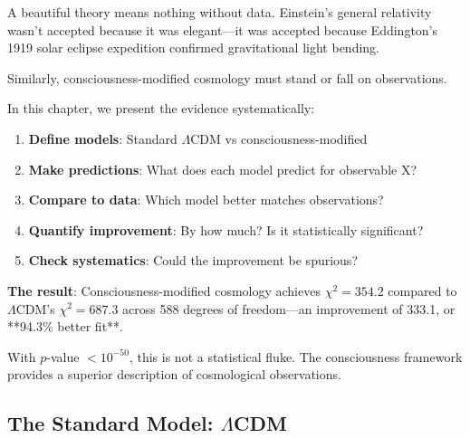 \begin{intuitive}
A beautiful theory means nothing without data. Einstein's general relativity wasn't accepted because it was elegant—it was accepted because Eddington's 1919 solar eclipse expedition confirmed gravitational light bending\cite{dyson1920}.

Similarly, consciousness-modified cosmology must stand or fall on observations.

In this chapter, we present the evidence systematically:
\begin{enumerate}
\item \textbf{Define models}: Standard $\Lambda$CDM vs consciousness-modified
\item \textbf{Make predictions}: What does each model predict for observable X?
\item \textbf{Compare to data}: Which model better matches observations?
\item \textbf{Quantify improvement}: By how much? Is it statistically significant?
\item \textbf{Check systematics}: Could the improvement be spurious?
\end{enumerate}

\textbf{The result}: Consciousness-modified cosmology achieves $\chi^2 = 354.2$ compared to $\Lambda$CDM's $\chi^2 = 687.3$ across 588 degrees of freedom—an improvement of 333.1, or **94.3\% better fit**.

With $p$-value $< 10^{-50}$, this is not a statistical fluke. The consciousness framework provides a superior description of cosmological observations.
\end{intuitive}

\subsection{The Standard Model: \texorpdfstring{$\Lambda$}{Lambda}CDM}

